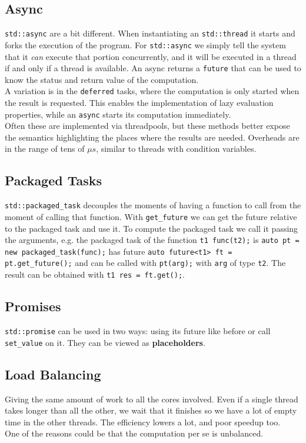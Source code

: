 \documentclass[10pt]{report}
\begin{document}
\subsection{Async}
\texttt{std::async} are a bit different. When instantiating an \texttt{std::thread} it starts and forks the execution of the program. For \texttt{std::async} we simply tell the system that it \textit{can} execute that portion concurrently, and it will be executed in a thread if and only if a thread is available. An async returns a \texttt{future} that can be used to know the status and return value of the computation.\\
A variation is in the \texttt{deferred} tasks, where the computation is only started when the result is requested. This enables the implementation of lazy evaluation properties, while an \texttt{async} starts its computation immediately.\\
Often these are implemented via threadpools, but these methods better expose the semantics highlighting the places where the results are needed. Overheads are in the range of tens of $\mu s$, similar to threads with condition variables.
\subsection{Packaged Tasks}
\texttt{std::packaged\_task} decouples the moments of having a function to call from the moment of calling that function. With \texttt{get\_future} we can get the future relative to the packaged task and use it. To compute the packaged task we call it passing the arguments, e.g. the packaged task of the function \texttt{t1 func(t2);} is \texttt{auto pt = new packaged\_task(func);} has future \texttt{auto future<t1> ft = pt.get\_future();} and can be called with \texttt{pt(arg);} with \texttt{arg} of type \texttt{t2}. The result can be obtained with \texttt{t1 res = ft.get();}.
\subsection{Promises}
\texttt{std::promise} can be used in two ways: using its future like before or call \texttt{set\_value} on it. They can be viewed as \textbf{placeholders}.
\subsection{Load Balancing} Giving the same amount of work to all the cores involved. Even if a single thread takes longer than all the other, we wait that it finishes so we have a lot of empty time in the other threads. The efficiency lowers a lot, and poor speedup too.\\
One of the reasons could be that the computation per se is unbalanced.
\end{document}
